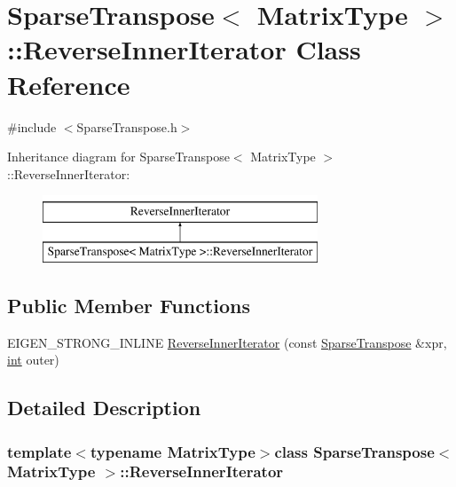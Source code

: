 \hypertarget{class_sparse_transpose_1_1_reverse_inner_iterator}{\section{Sparse\-Transpose$<$ Matrix\-Type $>$\-:\-:Reverse\-Inner\-Iterator Class Reference}
\label{class_sparse_transpose_1_1_reverse_inner_iterator}
}


{\ttfamily \#include $<$Sparse\-Transpose.\-h$>$}

Inheritance diagram for Sparse\-Transpose$<$ Matrix\-Type $>$\-:\-:Reverse\-Inner\-Iterator\-:\begin{figure}[H]
\begin{center}
\leavevmode
\includegraphics[height=2.000000cm]{class_sparse_transpose_1_1_reverse_inner_iterator}
\end{center}
\end{figure}
\subsection*{Public Member Functions}
\begin{DoxyCompactItemize}
\item 
E\-I\-G\-E\-N\-\_\-\-S\-T\-R\-O\-N\-G\-\_\-\-I\-N\-L\-I\-N\-E \hyperlink{class_sparse_transpose_1_1_reverse_inner_iterator_a73d9790dd877673672c7f023d17e6d2b}{Reverse\-Inner\-Iterator} (const \hyperlink{class_sparse_transpose}{Sparse\-Transpose} \&xpr, \hyperlink{ioapi_8h_a787fa3cf048117ba7123753c1e74fcd6}{int} outer)
\end{DoxyCompactItemize}


\subsection{Detailed Description}
\subsubsection*{template$<$typename Matrix\-Type$>$class Sparse\-Transpose$<$ Matrix\-Type $>$\-::\-Reverse\-Inner\-Iterator}



